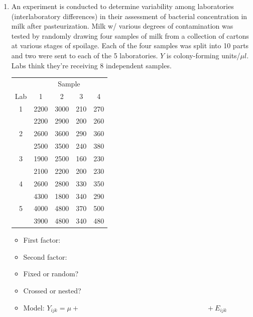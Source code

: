 \begin{enumerate}
\item An experiment is conducted to determine variability among laboratories (interlaboratory differences) in their assessment of bacterial 
concentration in milk after pasteurization.   Milk w/ various degrees of contamination was tested by randomly drawing four samples of milk from a collection of cartons at various stages of spoilage.  Each of the four samples was split into 10 parts and two were sent to each of the 5 laboratories.  $Y$ is colony-forming units/$\mu l$.  Labs think they're receiving 8 independent samples.
\begin{large}
\begin{center}
\begin{tabular}{c|cccc}
& \multicolumn{4}{c}{Sample} \\
Lab & 1 & 2 & 3 & 4 \\ \hline 
1 & 2200 & 3000 & 210 & 270 \\
  & 2200 & 2900 & 200 & 260 \\
2 & 2600 & 3600 & 290 & 360 \\
  & 2500 & 3500 & 240 & 380 \\
3 & 1900 & 2500 & 160 & 230 \\
  & 2100 & 2200 & 200 & 230 \\
4 & 2600 & 2800 & 330 & 350 \\
  & 4300 & 1800 & 340 & 290 \\
5 & 4000 & 4800 & 370 & 500 \\
  & 3900 & 4800 & 340 & 480 \\  
\end{tabular}
\end{center}
\end{large}

\begin{itemize}
\item First factor:
\item Second factor:
\item Fixed or random?
\item Crossed or nested?
\item Model:  $Y_{ijk} = \mu + \hspace{3in} + E_{ijk}$
\end{itemize}


\end{enumerate}
